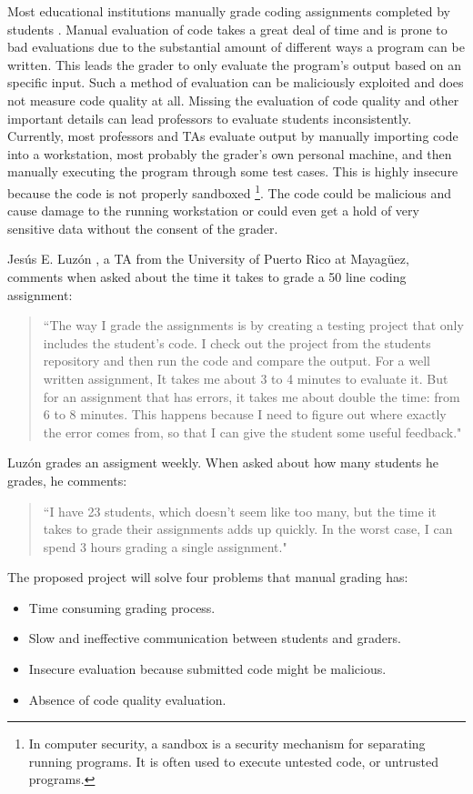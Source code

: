 
Most educational institutions manually grade coding assignments completed by
students \cite{Cheang2003}. Manual evaluation of code takes a great deal of time
and is prone to bad evaluations due to the substantial amount of different ways
a program can be written. This leads the grader to only evaluate the program's
output based on an specific input. Such a method of evaluation can be
maliciously exploited and does not measure code quality at all. Missing the
evaluation of code quality and other important details can lead professors to
evaluate students inconsistently. Currently, most professors and TAs evaluate
output by manually importing code into a workstation, most probably the grader's
own personal machine, and then manually executing the program through some test
cases. This is highly insecure because the code is not properly sandboxed
\footnote{In computer security, a sandbox is a security mechanism for separating
running programs. It is often used to execute untested code, or untrusted
programs.}. The code could be malicious and cause damage to the running
workstation or could even get a hold of very sensitive data without the consent
of the grader.

Jesús E. Luzón \cite{Chiki}, a TA from the University of Puerto Rico at
Mayagüez, comments when asked about the time it takes to grade a 50 line coding
assignment: \begin{quote} ``The way I grade the assignments is by creating a
testing project that only includes the student's code. I check out the project
from the students repository and then run the code and compare the output. For a
well written assignment, It takes me about 3 to 4 minutes to evaluate it. But
for an assignment that has errors, it takes me about double the time: from 6 to
8 minutes. This happens because I need to figure out where exactly the error
comes from, so that I can give the student some useful feedback." \end{quote}
Luzón grades an assigment weekly. When asked about how many students he grades,
he comments: \begin{quote} ``I have 23 students, which doesn't seem like too
many, but the time it takes to grade their assignments adds up quickly. In the
worst case, I can spend 3 hours grading a single assignment." \end{quote}
The proposed project will solve four problems that manual grading has:
\begin{itemize}
\item Time consuming grading process.
\item Slow and ineffective communication between students and graders.
\item Insecure evaluation because submitted code might be malicious.
\item Absence of code quality evaluation.
\end{itemize}

